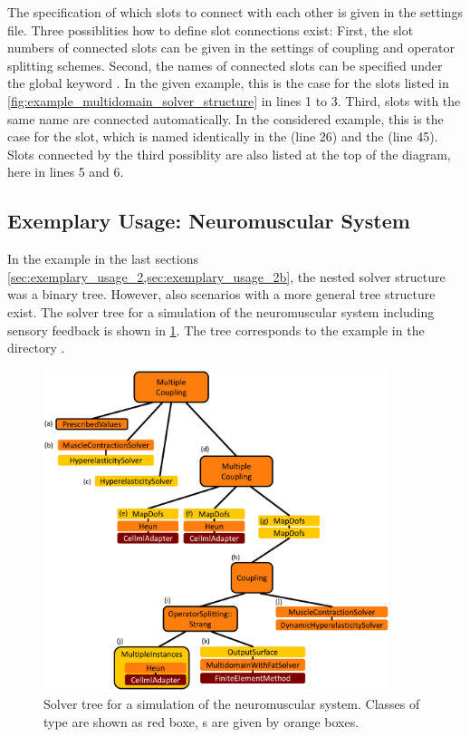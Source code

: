 The specification of which slots to connect with each other is given in the settings file. Three possiblities how to define slot connections exist: First, the slot numbers of connected slots can be given in the settings of coupling and operator splitting schemes. Second, the names of connected slots can be specified under the global keyword . In the given example, this is the case for the slots listed in \cref{fig:example_multidomain_solver_structure} in lines 1 to 3. Third, slots with the same name are connected automatically. In the considered example, this is the case for the  slot, which is named identically in the  (line 26) and the  (line 45). Slots connected by the third possiblity are also listed at the top of the diagram, here in lines 5 and 6.


\subsection{Exemplary Usage: Neuromuscular System}\label{sec:exemplary_usage_3}

In the example in the last sections \cref{sec:exemplary_usage_2,sec:exemplary_usage_2b}, the nested solver structure was a binary tree. However, also scenarios with a more general tree structure exist. The solver tree for a simulation of the neuromuscular system including sensory feedback is shown in \cref{fig:solver_tree_multidomain_spindles}. The tree corresponds to the example in the directory .

\begin{figure}
  \centering%
  \includegraphics[width=0.9\textwidth]{images/implementation/solver_tree_multidomain_spindles.pdf}%
  \caption{Solver tree for a simulation of the neuromuscular system. Classes of type  are shown as red boxe, s are given by orange boxes.}%
  \label{fig:solver_tree_multidomain_spindles}%
\end{figure}

